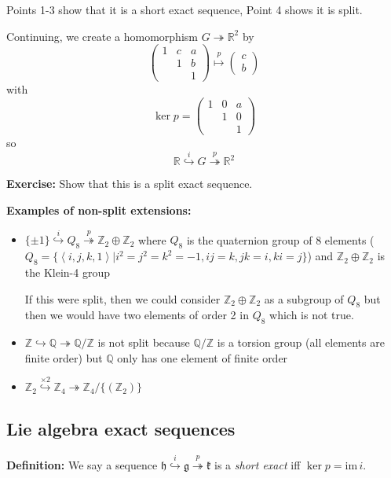 \documentclass[12pt]{article}
\newcommand{\R}{\mathbb{R}}
\newcommand{\Z}{\mathbb{Z}}
\newcommand{\Q}{\mathbb{Q}}
\newcommand{\brak}[1]{\left\langle #1 \right\rangle}
\newcommand{\im}{\text{im}\,}
\begin{document}
    Points 1-3 show that it is a short exact sequence, Point 4 shows it is split. 

    Continuing, we create a homomorphism $G \twoheadrightarrow \R^2$ by 
    \[\begin{pmatrix}
        1 & c & a\\ 
        & 1 & b\\ 
        & & 1
    \end{pmatrix} \overset{p}{\mapsto} \begin{pmatrix}
        c\\b
    \end{pmatrix}\]
    with 
    \[\ker p = \begin{pmatrix}
        1 & 0 & a\\ 
        & 1 & 0\\ 
        & & 1
    \end{pmatrix}\]
    so 
    \[\R \overset{i}{\hookrightarrow} G \overset{p}{\twoheadrightarrow} \R^2\] 

    \textbf{Exercise:} Show that this is a split exact sequence.

    \textbf{Examples of non-split extensions:} 
    \begin{itemize}
        \item $\{\pm 1\} \overset{i}{\hookrightarrow} Q_8 \overset{p}{\twoheadrightarrow} \Z_2 \oplus \Z_2$ where $Q_8$ is the quaternion group of 8 elements ($Q_8 = \{\brak{i, j, k, 1} \big\vert i^2 = j^2 = k^2 = -1, ij =k, jk=i, ki = j\}$) and $\Z_2 \oplus \Z_2$ is the Klein-4 group  
        
        If this were split, then we could consider $\Z_2 \oplus \Z_2$ as a subgroup of $Q_8$ but then we would have two elements of order 2 in $Q_8$ which is not true.  

        \item $\Z \hookrightarrow \Q \twoheadrightarrow \Q/\Z$ is not split because $\Q/\Z$ is a torsion group (all elements are finite order) but $\Q$ only has one element of finite order 
        
        \item $\Z_2 \overset{\times 2}{\hookrightarrow} \Z_4 \twoheadrightarrow \Z_4/\{(\Z_2)\}$ 
    \end{itemize}

\subsection*{Lie algebra exact sequences}       
    \textbf{Definition:} We say a sequence $\mathfrak{h} \overset{i}{\hookrightarrow} \mathfrak{g} \overset{p}{\twoheadrightarrow} \mathfrak{k}$ is a \emph{short exact} iff $\ker p = \im i$. 
\end{document}
